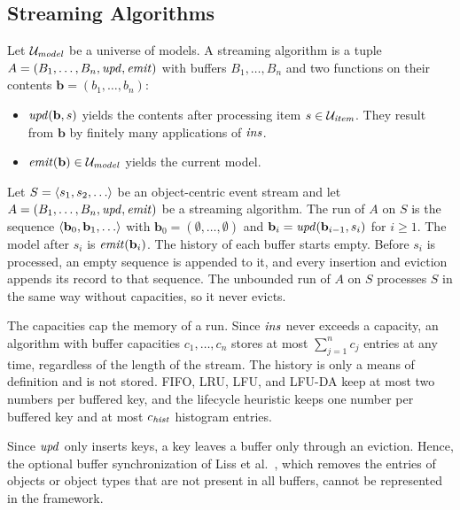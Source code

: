 \subsection{Streaming Algorithms}
\label{sec:framework:algorithms}

\begin{definition}
\label{def:algorithm}
Let $\mathcal{U}_{\mathit{model}}$ be a universe of models.
A streaming algorithm is a tuple $A = (B_1, \dots, B_n, \mathit{upd}, \mathit{emit})$
with buffers $B_1, \dots, B_n$ and two functions on their contents
$\mathbf{b} = (b_1, \dots, b_n)$:
\begin{itemize}
  \item $\mathit{upd}(\mathbf{b}, s)$ yields the contents after processing item
        $s \in \mathcal{U}_{\mathit{item}}$.
        They result from $\mathbf{b}$ by finitely many applications of
        $\mathit{ins}$.
  \item $\mathit{emit}(\mathbf{b}) \in \mathcal{U}_{\mathit{model}}$ yields the current model.
\end{itemize}
\end{definition}

\begin{definition}[Run]
\label{def:run}
Let $S = \la s_1, s_2, \dots \ra$ be an object-centric event stream and let
$A = (B_1, \dots, B_n, \mathit{upd}, \mathit{emit})$ be a streaming algorithm.
The run of $A$ on $S$ is the sequence $\la \mathbf{b}_0, \mathbf{b}_1, \dots \ra$
with $\mathbf{b}_0 = (\emptyset, \dots, \emptyset)$ and
$\mathbf{b}_i = \mathit{upd}(\mathbf{b}_{i-1}, s_i)$ for $i \ge 1$.
The model after $s_i$ is $\mathit{emit}(\mathbf{b}_i)$.
The history of each buffer starts empty.
Before $s_i$ is processed, an empty sequence is appended to it, and every
insertion and eviction appends its record to that sequence.
The unbounded run of $A$ on $S$ processes $S$ in the same way without
capacities, so it never evicts.
\end{definition}

The capacities cap the memory of a run.
Since $\mathit{ins}$ never exceeds a capacity, an algorithm with
buffer capacities $c_1, \dots, c_n$ stores at most $\sum_{j=1}^{n} c_j$ entries at any time, regardless of the length of the
stream.
The history is only a means of definition and is not stored.
FIFO, LRU, LFU, and LFU-DA keep at most two numbers per buffered key, and the
lifecycle heuristic keeps one number per buffered key and at most
$c_{\mathit{hist}}$ histogram entries.

Since $\mathit{upd}$ only inserts keys, a key leaves a buffer only through an
eviction.
Hence, the optional buffer synchronization of Liss et al.~\cite{Liss2025},
which removes the entries of objects or object types that are not present in
all buffers, cannot be represented in the framework.

